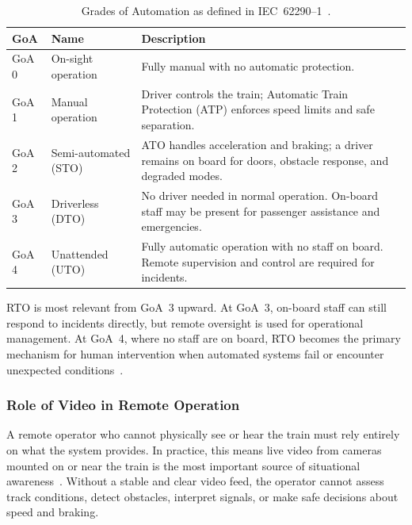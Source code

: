 \begin{table}[h]
\centering
\caption{Grades of Automation as defined in IEC~62290--1~\cite{iec62290, uitp2018}.}\label{tab:goa}
    \begin{tabular}{p{1cm} p{3cm} p{8cm}}
    \toprule
    \textbf{GoA} & \textbf{Name} & \textbf{Description} \\
    \midrule
    GoA 0 & On-sight operation   & Fully manual with no automatic protection.\\
    GoA 1 & Manual operation     & Driver controls the train; Automatic Train Protection (ATP) enforces speed limits and safe separation.\\
    GoA 2 & Semi-automated (STO) & ATO handles acceleration and braking; a driver remains on board for doors, obstacle response, and degraded modes.\\
    GoA 3 & Driverless (DTO)     & No driver needed in normal operation. On-board staff may be present for passenger assistance and emergencies. \\
    GoA 4 & Unattended (UTO)     & Fully automatic operation with no staff on board. Remote supervision and control are required for incidents. \\
    \bottomrule
    \end{tabular}
\end{table}
 
RTO is most relevant from GoA~3 upward. At GoA~3, on-board staff can still respond to incidents directly, but remote oversight is used for operational management. At GoA~4, where no staff are on board, RTO becomes the primary mechanism for human intervention when automated systems fail or encounter unexpected conditions~\cite{europesrail2025_d3, orr2024}.
 
\subsubsection{Role of Video in Remote Operation}\label{subsec:video-role}

A remote operator who cannot physically see or hear the train must rely entirely on what the system provides. In practice, this means live video from cameras mounted on or near the train is the most important source of situational awareness~\cite{brandenburger2023, kozarevic2025}. Without a stable and clear video feed, the operator cannot assess track conditions, detect obstacles, interpret signals, or make safe decisions about speed and braking.
 
